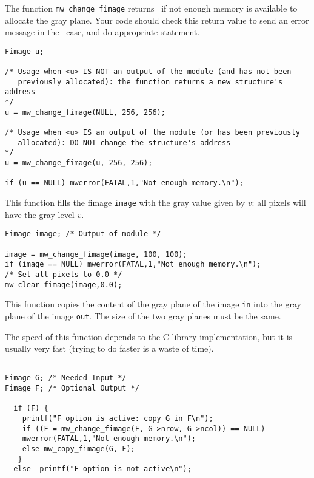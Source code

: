 The function \verb+mw_change_fimage+ returns \Null\ if not enough memory is available to allocate the gray plane. Your code should check this return value to 
send an error message in the \Null\ case, and do appropriate statement.

\Next
\Example
\begin{verbatim}
Fimage u; 

/* Usage when <u> IS NOT an output of the module (and has not been
   previously allocated): the function returns a new structure's address
*/
u = mw_change_fimage(NULL, 256, 256);

/* Usage when <u> IS an output of the module (or has been previously
   allocated): DO NOT change the structure's address
*/
u = mw_change_fimage(u, 256, 256);

if (u == NULL) mwerror(FATAL,1,"Not enough memory.\n");
\end{verbatim}


\newpage %

\Description
This function fills the fimage \verb+image+ with the gray value given by $v$:
all pixels will have the gray level $v$. 

\Next
\Example
\begin{verbatim}
Fimage image; /* Output of module */

image = mw_change_fimage(image, 100, 100);
if (image == NULL) mwerror(FATAL,1,"Not enough memory.\n");
/* Set all pixels to 0.0 */
mw_clear_fimage(image,0.0);

\end{verbatim}

\newpage %

\Description
This function copies the content of the gray plane of the image \verb+in+ into 
the gray plane of the image \verb+out+.
The size of the two gray planes must be the same.

The speed of this function depends to the C library implementation, but it is
usually very fast (trying to do faster is a waste of time).

\Next
\Example
\begin{verbatim}

Fimage G; /* Needed Input */
Fimage F; /* Optional Output */

  if (F) {
    printf("F option is active: copy G in F\n");
    if ((F = mw_change_fimage(F, G->nrow, G->ncol)) == NULL)
	mwerror(FATAL,1,"Not enough memory.\n");
    else mw_copy_fimage(G, F);
   }
  else  printf("F option is not active\n");
\end{verbatim}

